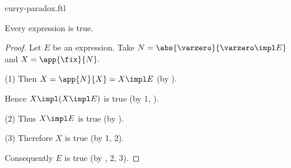 \documentclass{stex}
\begin{document}
\begin{smodule}{curry-paradox.ftl}
\begin{forthel}
  \begin{theorem*}[title=Curry's Paradox,name=Curry Paradox]
    Every expression is true.
  \end{theorem*}
  \begin{proof}
    Let $E$ be an expression.
    Take $N = \abs{\varzero}{\varzero \impl E}$ and $X = \app{\fix}{N}.$

    (1) Then $X = \app{N}{X} = X \impl E$ (by ).

    Hence $X \impl (X \impl E)$ is true (by 1, ).

    (2) Thus $X \impl E$ is true (by ).

    (3) Therefore $X$ is true (by 1, 2).

    Consequently $E$ is true (by , 2, 3).
  \end{proof}
\end{forthel}

\printbibliography
{}
\end{smodule}
\end{document}
